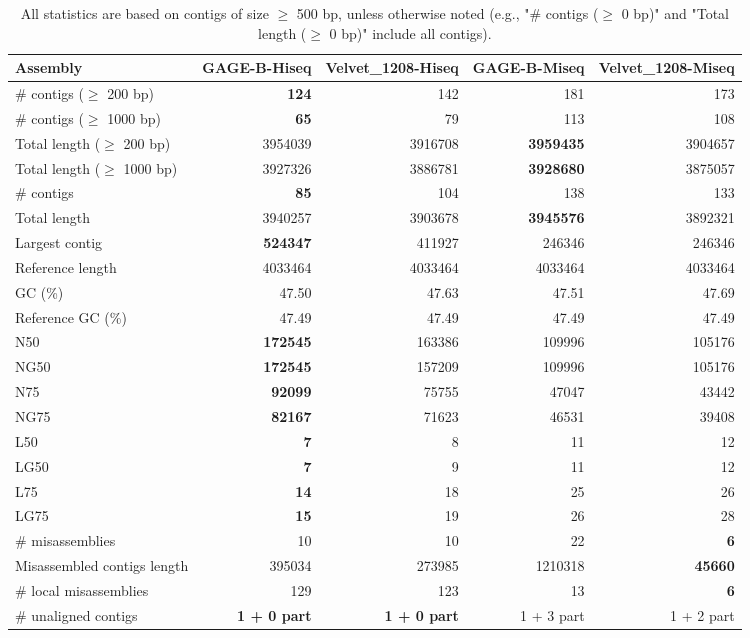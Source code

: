 \documentclass[12pt,a4paper]{article}
\begin{document}
\begin{table}[ht]
\begin{center}
\caption{All statistics are based on contigs of size $\geq$ 500 bp, unless otherwise noted (e.g., "\# contigs ($\geq$ 0 bp)" and "Total length ($\geq$ 0 bp)" include all contigs).}
\begin{tabular}{|l*{4}{|r}|}
\hline
Assembly & GAGE-B-Hiseq & Velvet\_1208-Hiseq & GAGE-B-Miseq & Velvet\_1208-Miseq \\ \hline
\# contigs ($\geq$ 200 bp) & {\bf 124} & 142 & 181 & 173 \\ \hline
\# contigs ($\geq$ 1000 bp) & {\bf 65} & 79 & 113 & 108 \\ \hline
Total length ($\geq$ 200 bp) & 3954039 & 3916708 & {\bf 3959435} & 3904657 \\ \hline
Total length ($\geq$ 1000 bp) & 3927326 & 3886781 & {\bf 3928680} & 3875057 \\ \hline
\# contigs & {\bf 85} & 104 & 138 & 133 \\ \hline
Total length & 3940257 & 3903678 & {\bf 3945576} & 3892321 \\ \hline
Largest contig & {\bf 524347} & 411927 & 246346 & 246346 \\ \hline
Reference length & 4033464 & 4033464 & 4033464 & 4033464 \\ \hline
GC (\%) & 47.50 & 47.63 & 47.51 & 47.69 \\ \hline
Reference GC (\%) & 47.49 & 47.49 & 47.49 & 47.49 \\ \hline
N50 & {\bf 172545} & 163386 & 109996 & 105176 \\ \hline
NG50 & {\bf 172545} & 157209 & 109996 & 105176 \\ \hline
N75 & {\bf 92099} & 75755 & 47047 & 43442 \\ \hline
NG75 & {\bf 82167} & 71623 & 46531 & 39408 \\ \hline
L50 & {\bf 7} & 8 & 11 & 12 \\ \hline
LG50 & {\bf 7} & 9 & 11 & 12 \\ \hline
L75 & {\bf 14} & 18 & 25 & 26 \\ \hline
LG75 & {\bf 15} & 19 & 26 & 28 \\ \hline
\# misassemblies & 10 & 10 & 22 & {\bf 6} \\ \hline
Misassembled contigs length & 395034 & 273985 & 1210318 & {\bf 45660} \\ \hline
\# local misassemblies & 129 & 123 & 13 & {\bf 6} \\ \hline
\# unaligned contigs & {\bf 1 + 0 part} & {\bf 1 + 0 part} & 1 + 3 part & 1 + 2 part \\ \hline

\end{tabular}
\end{center}
\end{table}
\end{document}
